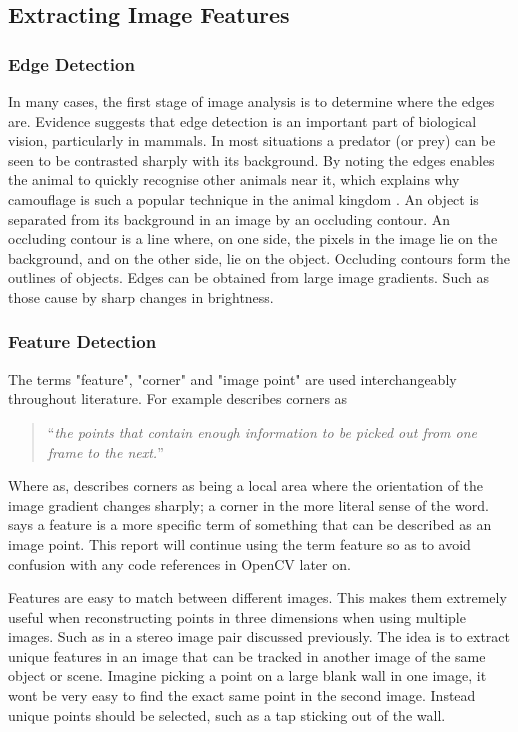\documentclass[11pt,oneside]{report}
\begin{document}
				\subsection{Extracting Image Features}
					\subsubsection{Edge Detection}
					In many cases, the first stage of image analysis is to determine where the edges are.
					Evidence suggests that edge detection is an important part of biological vision, particularly in mammals.
					In most situations a predator (or prey) can be seen to be contrasted sharply with its background.
					By noting the edges enables the animal to quickly recognise other animals near it, which explains why camouflage is such a popular technique in the animal kingdom \cite{book:aiIlluminated}.
					An object is separated from its background in an image by an occluding contour.
					An occluding contour is a line where, on one side, the pixels in the image lie on the background, and on the other side, lie on the object.
					Occluding contours form the outlines of objects.
					Edges can be obtained from large image gradients.
					Such as those cause by sharp changes in brightness.
					\subsubsection{Feature Detection}
					The terms "feature", "corner" and "image point" are used interchangeably throughout literature.
					For example  describes corners as
					\begin{quote}
						``\textit{the points that contain enough information to be picked out from one frame to the next.}''
					\end{quote}
					Where as,  describes corners as being a local area where the orientation of the image gradient changes sharply; a corner in the more literal sense of the word.
					 says a feature is a more specific term of something that can be described as an image point.
					This report will continue using the term feature so as to avoid confusion with any code references in OpenCV later on.
					
					Features are easy to match between different images.
					This makes them extremely useful when reconstructing points in three dimensions when using multiple images.
					Such as in a stereo image pair discussed previously.
					The idea is to extract unique features in an image that can be tracked in another image of the same object or scene.
					Imagine picking a point on a large blank wall in one image, it wont be very easy to find the exact same point in the second image.
					Instead unique points should be selected, such as a tap sticking out of the wall.
					
\end{document}
